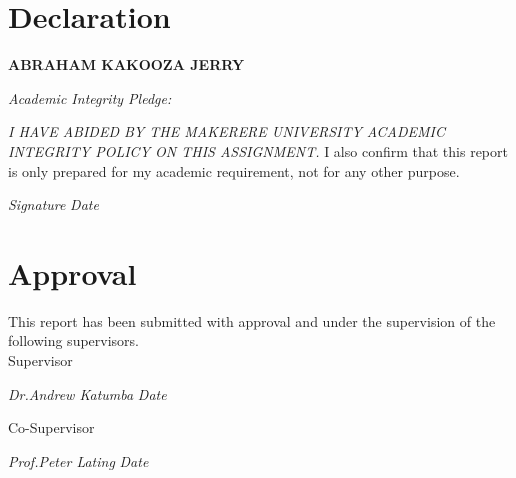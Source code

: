 \documentclass[12pt]{report}
\begin{document}
				



\section*{Declaration}

\textbf{ABRAHAM KAKOOZA JERRY}

\emph{Academic Integrity Pledge:}

\emph{
  I HAVE ABIDED BY THE MAKERERE UNIVERSITY ACADEMIC INTEGRITY POLICY ON THIS
ASSIGNMENT.
}
I also confirm that this report is only prepared for my academic requirement, not for any other
purpose.


\emph{Signature} \hspace{0.5cm} \makebox[1.5in]{\hrulefill} \hspace{0.5cm} \emph{Date} \hspace{0.5cm} \makebox[1.5in]{\hrulefill}

\newpage


\section*{Approval}

\vspace{2cm}
\begin{center}
  This report has been submitted with approval and under the supervision of the following
  supervisors.\\
  
  Supervisor

  \emph{Dr.Andrew Katumba} \hspace{0.5cm} \makebox[1.5in]{\hrulefill} \hspace{0.5cm} \emph{Date} \hspace{0.5cm} \makebox[1.5in]{\hrulefill}

  Co-Supervisor

  \emph{Prof.Peter Lating} \hspace{0.5cm} \makebox[1.5in]{\hrulefill} \hspace{0.5cm} \emph{Date} \hspace{0.5cm} \makebox[1.5in]{\hrulefill}


\end{center}
\end{document}
